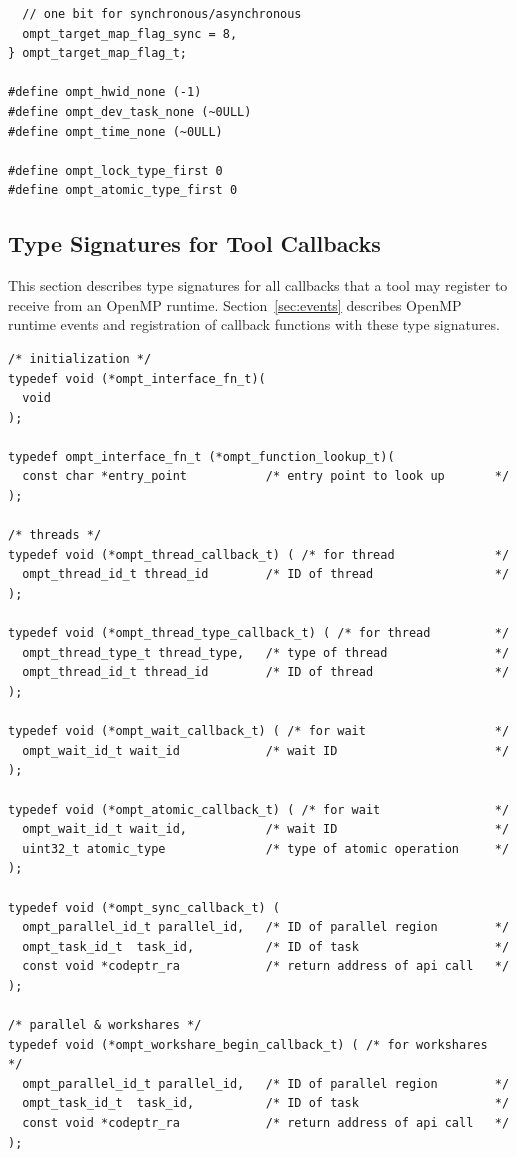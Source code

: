 \documentclass{article}
\begin{document}
{\begin{verbatim}
  // one bit for synchronous/asynchronous
  ompt_target_map_flag_sync = 8,   
} ompt_target_map_flag_t;

#define ompt_hwid_none (-1)
#define ompt_dev_task_none (~0ULL)
#define ompt_time_none (~0ULL)

#define ompt_lock_type_first 0
#define ompt_atomic_type_first 0
\end{verbatim}
\clearpage

\subsection{Type Signatures for Tool Callbacks}
\label{appendix:ompt-types:callbacks}
This section describes type signatures for all  callbacks that a tool may register to receive from an OpenMP runtime. Section~\ref{sec:events} describes OpenMP runtime events and registration of
callback functions with these type signatures.

\begin{verbatim}
/* initialization */
typedef void (*ompt_interface_fn_t)(
  void
);

typedef ompt_interface_fn_t (*ompt_function_lookup_t)(
  const char *entry_point           /* entry point to look up       */
);

/* threads */	
typedef void (*ompt_thread_callback_t) ( /* for thread              */	   
  ompt_thread_id_t thread_id        /* ID of thread                 */
);

typedef void (*ompt_thread_type_callback_t) ( /* for thread         */
  ompt_thread_type_t thread_type,   /* type of thread               */	   
  ompt_thread_id_t thread_id        /* ID of thread                 */
);
	
typedef void (*ompt_wait_callback_t) ( /* for wait                  */
  ompt_wait_id_t wait_id            /* wait ID                      */
);

typedef void (*ompt_atomic_callback_t) ( /* for wait                */
  ompt_wait_id_t wait_id,           /* wait ID                      */
  uint32_t atomic_type              /* type of atomic operation     */
);

typedef void (*ompt_sync_callback_t) ( 			   
  ompt_parallel_id_t parallel_id,   /* ID of parallel region        */
  ompt_task_id_t  task_id,          /* ID of task                   */
  const void *codeptr_ra            /* return address of api call   */
);

/* parallel & workshares */									    
typedef void (*ompt_workshare_begin_callback_t) ( /* for workshares   */			   
  ompt_parallel_id_t parallel_id,   /* ID of parallel region        */
  ompt_task_id_t  task_id,          /* ID of task                   */
  const void *codeptr_ra            /* return address of api call   */
);								    
							   	    

\end{verbatim}}
\end{document}
